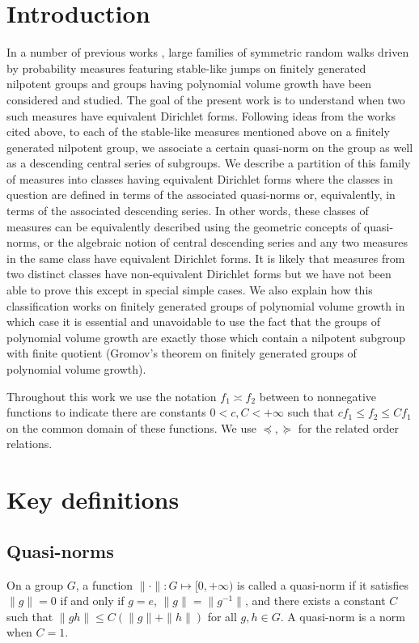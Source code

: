 \documentclass[pdflatex,sn-mathphys-num]{sn-jnl}%
\theoremstyle{thmstyleone}%
\theoremstyle{thmstyletwo}%
\theoremstyle{thmstylethree}%
\begin{document}
\section{Introduction} In a number of previous works \cite{CKSCWZ,CKSCWZ1,SCRZ,SCZ-nil}, large families of symmetric random walks driven by probability measures featuring stable-like jumps on finitely generated nilpotent groups and groups having  polynomial volume growth have been considered and studied. The goal of the present work is to understand when two such measures have equivalent Dirichlet forms.
Following  ideas from the  works cited above,  to each of the stable-like measures mentioned above on a finitely generated nilpotent group, we associate a certain quasi-norm on the group as well as a descending central series of subgroups. We describe
a partition of this family of  measures into classes having equivalent Dirichlet forms where the classes in question are defined in terms of the associated quasi-norms or, equivalently, in terms of the associated descending series. In other words, these classes of measures can be equivalently described using the geometric concepts of quasi-norms, or the algebraic notion of central descending series and any two measures in the same class have equivalent Dirichlet forms. It is likely that measures from two distinct classes have non-equivalent Dirichlet forms but we have not been able to prove this except in special simple cases. We also explain how this classification works on finitely generated groups of polynomial volume growth in which case it is essential and unavoidable to use  the fact that the groups of polynomial volume growth are exactly those which contain a nilpotent subgroup with finite quotient (Gromov's theorem on finitely generated groups of polynomial volume growth).

Throughout this work we use the notation $f_1\asymp f_2$ between to nonnegative functions to indicate  there are constants $0<c,C<+\infty$ such that $cf_1\le f_2\le Cf_1$ on the common domain of these functions. We use $\preccurlyeq, \succcurlyeq$ for the related order relations.

\section{Key definitions}

\subsection{Quasi-norms} On a group $G$, a function $\|\cdot\|: G\mapsto [0,+\infty)$ is called a quasi-norm if it satisfies $\|g\|=0$ if and only if $g=e$, $\|g\|=\|g^{-1}\|$, and there exists a constant $C$ such that 
$\|gh\|\le C(\|g\|+\|h\|)$ for all $g,h\in G$. A quasi-norm is a norm when $C=1$.
\end{document}
